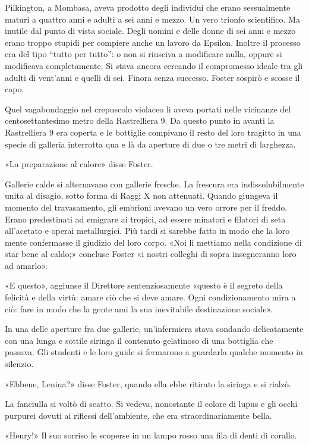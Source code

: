 \documentclass[
a5paper, %
10pt, %
twoside, 
onecolumn, %
openany, %
]{memoir}
\begin{document}
Pilkington, a Mombasa, aveva prodotto degli individui che erano sessualmente maturi a quattro anni e adulti a sei anni e mezzo. Un vero trionfo scientifico. Ma inutile dal punto di vista sociale. Degli uomini e delle donne di sei anni e mezzo erano troppo stupidi per compiere anche un lavoro da Epsilon. Inoltre il processo era del tipo “tutto per tutto”: o non si riusciva a modificare nulla, oppure si modificava completamente. Si stava ancora cercando il compromesso ideale tra gli adulti di vent’anni e quelli di sei. Finora senza successo. Foster sospirò e scosse il capo.

Quel vagabondaggio nel crepuscolo violaceo li aveva portati nelle vicinanze del centosettantesimo metro della Rastrelliera 9. Da questo punto in avanti la Rastrelliera 9 era coperta e le bottiglie compivano il resto del loro tragitto in una specie di galleria interrotta qua e là da aperture di due o tre metri di larghezza.

«La preparazione al calore» disse Foster.

Gallerie calde si alternavano con gallerie fresche. La frescura era indissolubilmente unita al disagio, sotto forma di Raggi X non attenuati. Quando giungeva il momento del travasamento, gli embrioni avevano un vero orrore per il freddo. Erano predestinati ad emigrare ai tropici, ad essere minatori e filatori di seta all’acetato e operai metallurgici. Più tardi si sarebbe fatto in modo che la loro mente confermasse il giudizio del loro corpo. «Noi li mettiamo nella condizione di star bene al caldo;» concluse Foster «i nostri colleghi di sopra insegneranno loro ad amarlo».

«E questo», aggiunse il Direttore sentenziosamente «questo è il segreto della felicità e della virtù: amare ciò che si deve amare. Ogni condizionamento mira a ciò: fare in modo che la gente ami la sua inevitabile destinazione sociale».

In una delle aperture fra due gallerie, un’infermiera stava sondando delicatamente con una lunga e sottile siringa il contenuto gelatinoso di una bottiglia che passava. Gli studenti e le loro guide si fermarono a guardarla qualche momento in silenzio.

«Ebbene, Lenina?» disse Foster, quando ella ebbe ritirato la siringa e si rialzò.

La fanciulla si voltò di scatto. Si vedeva, nonostante il colore di lupus e gli occhi purpurei dovuti ai riflessi dell’ambiente, che era straordinariamente bella.

«Henry!» Il suo sorriso le scoperse in un lampo rosso una fila di denti di corallo.
\end{document}
